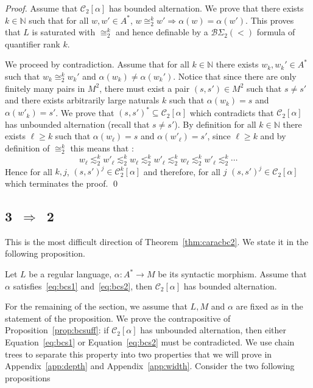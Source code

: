 \documentclass[envcountsame]{llncs}
\newcommand\nat{\ensuremath{\mathbb{N}}\xspace}
\newcommand\Cs{\ensuremath{\mathcal{C}}\xspace}
\newcommand\Cslevk[2]{\ensuremath{\Cs_{#1}^{#2}}\xspace}
\newcommand\Cstwo{\ensuremath{\Cs_2}\xspace}
\newcommand{\bsw}[1]{\ensuremath{\mathcal{B}\Sigma_{#1}(<)}\xspace}
\newcommand\sieq[2]{\ensuremath{\lesssim^{#1}_{#2}}\xspace}
\newcommand\ksieq[1]{\sieq{k}{#1}}
\newcommand\bceq[2]{\ensuremath{\cong^{#1}_{#2}}\xspace}
\newcommand\kbceq[1]{\bceq{k}{#1}}
\let\geq\geqslant
\newcommand\chain{chain\xspace}
\begin{document}
\begin{proof}
  Assume that $\Cstwo[\alpha]$ has bounded alternation. We prove that
  there exists $k \in \nat$ such that for all $w,w' \in A^*$, $w
  \kbceq{2} w' \Rightarrow \alpha(w) = \alpha(w')$. This proves that $L$
  is saturated with $\kbceq{2}$ and hence definable by a \bsw{2} formula
  of quantifier rank $k$.

  We proceed by contradiction. Assume that for all $k \in \nat$ there
  exists $w_k,w_k' \in A^*$ such that $w_k \kbceq{2} w_k'$ and
  $\alpha(w_k) \neq \alpha(w_k')$. Notice that since there are only
  finitely many pairs in $M^2$, there must exist a pair $(s,s') \in M^2$
  such that $s \neq s'$ and there exists arbitrarily large naturals $k$
  such that $\alpha(w_k)=s$ and $\alpha(w'_k) = s'$. We prove that
  $(s,s')^* \subseteq \Cstwo[\alpha]$ which contradicts that
  $\Cstwo[\alpha]$ has unbounded alternation (recall that $s \neq
  s'$). By definition for all $k \in \nat$ there exists $\ell \geq k$
  such that $\alpha(w_{\ell})=s$ and $\alpha(w'_{\ell}) = s'$, since $\ell
  \geq k$ and by definition of $\kbceq{2}$ this means that :
  \[
  w_{\ell} \ksieq{2} w'_{\ell} \ksieq{2} w_{\ell} \ksieq{2} w'_{\ell}
  \ksieq{2} w_{\ell} \ksieq{2} w'_{\ell} \ksieq{2} \cdots
  \]
  Hence for all $k,j$, $(s,s')^j \in \Cslevk2k[\alpha]$ and therefore,
  for all $j$  $(s,s')^j \in \Cstwo[\alpha]$ which terminates the proof.
  \qed
\end{proof}

\subsection{3~$\Rightarrow$~2}

This is the most difficult direction of Theorem~\ref{thm:caracbc2}. We
state it in the following proposition.

\begin{proposition} \label{prop:bcsuff}
  Let $L$ be a regular language, $\alpha : A^* \rightarrow M$ be its
  syntactic morphism. Assume that $\alpha$ satisfies~\eqref{eq:bcs1}
  and~\eqref{eq:bcs2}, then $\Cstwo[\alpha]$ has bounded alternation.
\end{proposition}

For the remaining of the section, we assume that $L,M$ and $\alpha$
are fixed as in the statement of the proposition. We prove the
contrapositive of Proposition~\ref{prop:bcsuff}: if $\Cstwo[\alpha]$
has unbounded alternation, then either Equation~\eqref{eq:bcs1} or
Equation~\eqref{eq:bcs2} must be contradicted. We use \chain trees to
separate this property into two properties that we will prove in
Appendix~\ref{app:depth} and Appendix~\ref{app:width}. Consider the
two following propositions 
\end{document}
